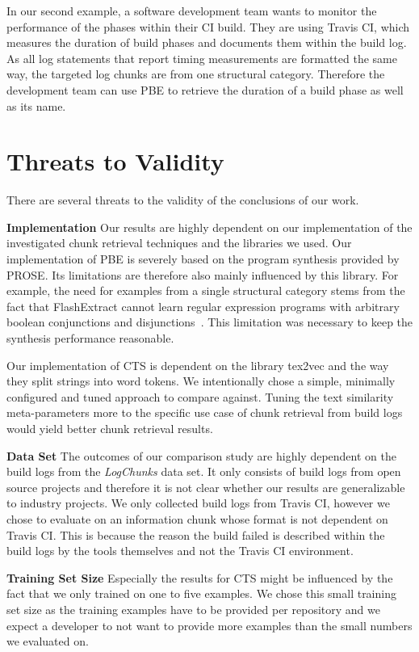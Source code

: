 In our second example, a software development team wants to monitor the performance of the phases within their CI build.
They are using Travis CI, which measures the duration of build phases and documents them within the build log.
As all log statements that report timing measurements are formatted the same way, the targeted log chunks are from one structural category.
Therefore the development team can use PBE to retrieve the duration of a build phase as well as its name.

\section{Threats to Validity}
There are several threats to the validity of the conclusions of our work.

\noindent
\textbf{Implementation}
Our results are highly dependent on our implementation of the investigated chunk retrieval techniques and the libraries we used.
Our implementation of PBE is severely based on the program synthesis provided by PROSE\@.
Its limitations are therefore also mainly influenced by this library.
For example, the need for examples from a single structural category stems from the fact that FlashExtract cannot learn regular expression programs with arbitrary boolean conjunctions and disjunctions~\cite{mayer2015user}.
This limitation was necessary to keep the synthesis performance reasonable.

Our implementation of CTS is dependent on the library tex2vec and the way they split strings into word tokens.
We intentionally chose a simple, minimally configured and tuned approach to compare against.
Tuning the text similarity meta-parameters more to the specific use case of chunk retrieval from build logs would yield better chunk retrieval results.

\noindent
\textbf{Data Set}
The outcomes of our comparison study are highly dependent on the build logs from the \emph{LogChunks} data set.
It only consists of build logs from open source projects and therefore it is not clear whether our results are generalizable to industry projects.
We only collected build logs from Travis CI, however we chose to evaluate on an information chunk whose format is not dependent on Travis CI\@.
This is because the reason the build failed is described within the build logs by the tools themselves and not the Travis CI environment.

\noindent
\textbf{Training Set Size}
Especially the results for CTS might be influenced by the fact that we only trained on one to five examples.
We chose this small training set size as the training examples have to be provided per repository and we expect a developer to not want to provide more examples than the small numbers we evaluated on.

